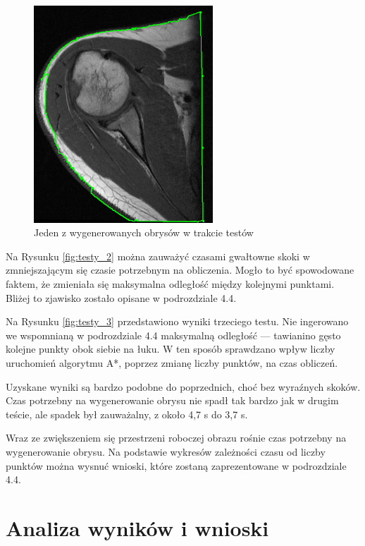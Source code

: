 \documentclass[a4paper,11pt,twoside,openright]{report}
\theoremstyle{definition}
\begin{document}
\begin{figure}[h!]
	\center
	\includegraphics[width=0.6\textwidth]{108}
	\caption{Jeden z wygenerowanych obrysów w trakcie testów}
    	\label{fig:108}
\end{figure}


Na Rysunku \ref{fig:testy_2} można zauważyć czasami gwałtowne skoki w zmniejszającym
się czasie potrzebnym na obliczenia. Mogło to być spowodowane faktem, że zmieniała
się maksymalna odległość między kolejnymi punktami. Bliżej to zjawisko zostało
opisane w podrozdziale 4.4.

Na Rysunku \ref{fig:testy_3} przedstawiono wyniki trzeciego testu. Nie ingerowano
we wspomnianą w podrozdziale 4.4 maksymalną odległość --- tawianino gęsto kolejne
punkty obok siebie na łuku. W ten sposób sprawdzano wpływ liczby uruchomień
algorytmu A*, poprzez zmianę liczby punktów, na czas obliczeń.

Uzyskane wyniki są bardzo podobne do poprzednich, choć bez wyraźnych skoków.
Czas potrzebny na wygenerowanie obrysu nie spadł tak bardzo jak w drugim teście,
ale spadek był zauważalny, z około 4,7 s do 3,7 s.

Wraz ze zwiększeniem się przestrzeni roboczej obrazu rośnie czas potrzebny na
wygenerowanie obrysu. Na podstawie wykresów zależności czasu od liczby punktów
można wysnuć wnioski, które zostaną zaprezentowane w podrozdziale 4.4.

\section {Analiza wyników i wnioski}
\end{document}
